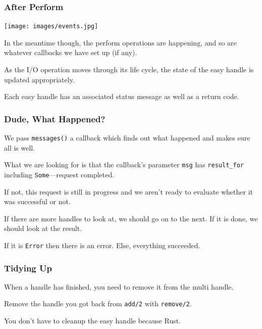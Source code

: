 \begin{frame}
\frametitle{After Perform}

\begin{center}
	\texttt{[image: images/events.jpg]}
\end{center}


In the meantime though, the perform operations are happening, and so are whatever callbacks we have set up (if any).

As the I/O operation moves through its life cycle, the state of the easy handle is updated appropriately. 

Each easy handle has an associated status message as well as a return code.

\end{frame}


\begin{frame}
\frametitle{Dude, What Happened?}


We pass \texttt{messages()} a callback which finds out what happened and makes sure all is well.

What we are looking for is that the callback's parameter \texttt{msg} has \texttt{result\_for} including \texttt{Some}---request completed. 

If not, this request is still in progress and we aren't ready to evaluate whether it was successful or not. 

If there are more handles to look at, we should go on to the next. If it is done, we should look at the result. 

If it is \texttt{Error} then there is an error. Else, everything succeeded.

\end{frame}


\begin{frame}
\frametitle{Tidying Up}

When a handle has finished, you need to remove it from the multi handle.

 Remove the handle you got back from \texttt{add/2} with \texttt{remove/2}. 
 
 You don't have to cleanup the easy handle because Rust.


\end{frame}


